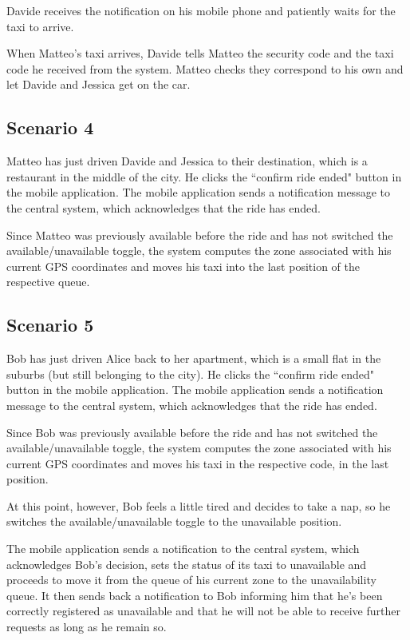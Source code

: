 Davide receives the notification on his mobile phone and patiently waits for the taxi to arrive.

When Matteo's taxi arrives, Davide tells Matteo the security code and the taxi code he received from the system. Matteo checks they correspond to his own and let Davide and Jessica get on the car.


\subsection{Scenario 4}
Matteo has just driven Davide and Jessica to their destination, which is a restaurant in the middle of the city. He clicks the ``confirm ride ended" button in the mobile application. The mobile application sends a notification message to the central system, which acknowledges that the ride has ended.

Since Matteo was previously available before the ride and has not switched the available/unavailable toggle, the system computes the zone associated with his current GPS coordinates and moves his taxi into the last position of the respective queue.


\subsection{Scenario 5}
Bob has just driven Alice back to her apartment, which is a small flat in the suburbs (but still belonging to the city). He clicks the ``confirm ride ended" button in the mobile application. The mobile application sends a notification message to the central system, which acknowledges that the ride has ended.

Since Bob was previously available before the ride and has not switched the available/unavailable toggle, the system computes the zone associated with his current GPS coordinates and moves his taxi in the respective code, in the last position.

At this point, however, Bob feels a little tired and decides to take a nap, so he switches the available/unavailable toggle to the unavailable position.

The mobile application sends a notification to the central system, which acknowledges Bob's decision, sets the status of its taxi to unavailable and proceeds to move it from the queue of his current zone to the unavailability queue. It then sends back a notification to Bob informing him that he’s been correctly registered as unavailable and that he will not be able to receive further requests as long as he remain so.

